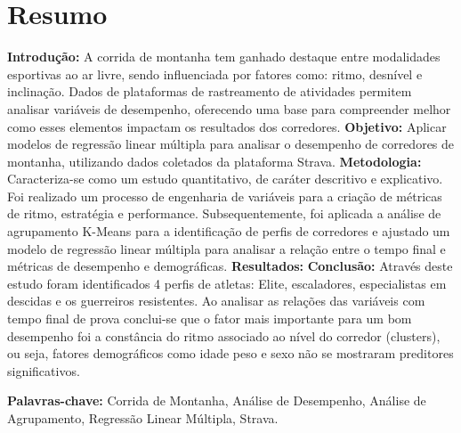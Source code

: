 \chapter*{Resumo}
\thispagestyle{empty}
\label{chap:resumo}

\textbf{Introdução:} A corrida de montanha tem ganhado destaque entre modalidades esportivas ao ar livre, sendo influenciada por fatores como: ritmo, desnível e inclinação. Dados de plataformas de rastreamento de atividades permitem analisar variáveis de desempenho, oferecendo uma base para compreender melhor como esses elementos impactam os resultados dos corredores.
\textbf{Objetivo:} Aplicar modelos de regressão linear múltipla para analisar o desempenho de corredores de montanha, utilizando dados coletados da plataforma Strava.
\textbf{Metodologia:} Caracteriza-se como um estudo quantitativo, de caráter descritivo e explicativo. Foi realizado um processo de engenharia de variáveis para a criação de métricas de ritmo, estratégia e performance. Subsequentemente, foi aplicada a análise de agrupamento K-Means para a identificação de perfis de corredores e ajustado um modelo de regressão linear múltipla para analisar a relação entre o tempo final e métricas de desempenho e demográficas.
\textbf{Resultados:}
\textbf{Conclusão:} Através deste estudo foram identificados 4 perfis de atletas: Elite, escaladores, especialistas em descidas e os guerreiros resistentes. Ao analisar as relações das variáveis com tempo final de prova conclui-se que o fator mais importante para um bom desempenho foi a constância do ritmo associado ao nível do corredor (clusters), ou seja, fatores demográficos como idade peso e sexo não se mostraram preditores significativos.

\vspace{0.5\baselineskip}
\textbf{Palavras-chave:} Corrida de Montanha, Análise de Desempenho, Análise de Agrupamento, Regressão Linear Múltipla, Strava.